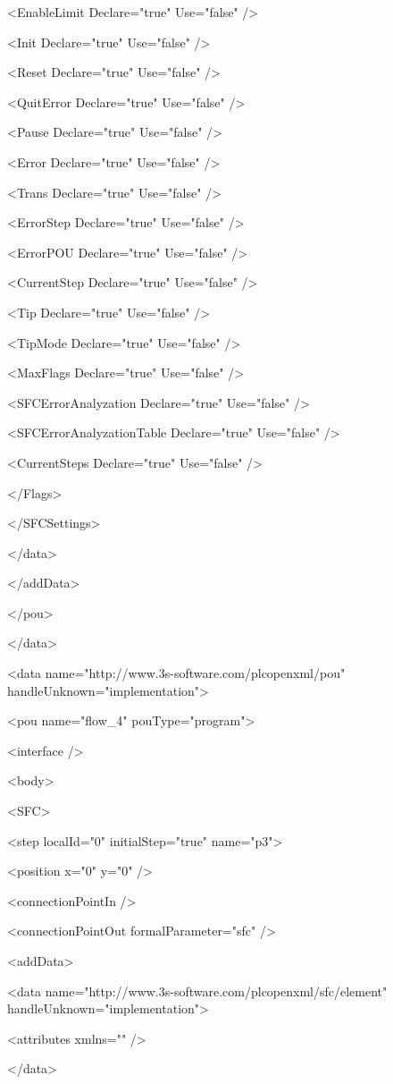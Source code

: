 {   <EnableLimit Declare="true" Use="false" />

   <Init Declare="true" Use="false" />

   <Reset Declare="true" Use="false" />

   <QuitError Declare="true" Use="false" />

   <Pause Declare="true" Use="false" />

   <Error Declare="true" Use="false" />

   <Trans Declare="true" Use="false" />

   <ErrorStep Declare="true" Use="false" />

   <ErrorPOU Declare="true" Use="false" />

   <CurrentStep Declare="true" Use="false" />

   <Tip Declare="true" Use="false" />

   <TipMode Declare="true" Use="false" />

   <MaxFlags Declare="true" Use="false" />

   <SFCErrorAnalyzation Declare="true" Use="false" />

   <SFCErrorAnalyzationTable Declare="true" Use="false" />

   <CurrentSteps Declare="true" Use="false" />

  </Flags>

 </SFCSettings>

</data>

</addData>

</pou>

</data>

<data name="http://www.3s-software.com/plcopenxml/pou" handleUnknown="implementation">

<pou name="flow\_4" pouType="program">

<interface />

<body>

<SFC>

 <step localId="0" initialStep="true" name="p3">

  <position x="0" y="0" />

  <connectionPointIn />

  <connectionPointOut formalParameter="sfc" />

  <addData>

   <data name="http://www.3s-software.com/plcopenxml/sfc/element" handleUnknown="implementation">

    <attributes xmlns="" />

   </data>

}
